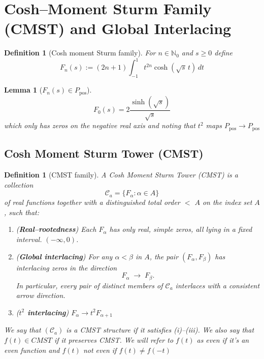 \documentclass[11pt]{article}
\theoremstyle{breakdef}
\newtheorem{lemma}[theorem]{Lemma}
\newtheorem{definition}[theorem]{Definition}
\begin{document}
\section{Cosh--Moment Sturm Family (CMST) and Global Interlacing}
\begin{definition}[Cosh moment Sturm family]\label{def:CMST}
For $n \in \mathbb{N}_0$ and $s\ge0$ define
\begin{equation}
F_n(s):=(2n+1)\int_{-1}^1 t^{2n}\cosh(\sqrt{s}\,t)\,dt
\end{equation}

\end{definition}
\begin{lemma}[$F_n(s) \in P_{\mathrm{pos}}$]
\begin{equation}
F_0(s) = 2\frac{\sinh \left(\sqrt{s}\right)}{\sqrt{s}}
\end{equation}
which only has zeros on the negative real axis and noting that $ t^2$ maps $P_{\mathrm{pos}} \to P_{\mathrm{pos}} $
\end{lemma}

\subsection*{Cosh Moment Sturm Tower (CMST)}

\begin{definition}[CMST family]
A \emph{Cosh Moment Sturm Tower} (CMST) is a collection
\[
\mathcal{C}_a = \{F_\alpha : \alpha\in A\}
\]
of real functions together
with a distinguished total order $<$ $A$ on the index set $A$, such that:

\begin{enumerate}
  \item[(i)] (\textbf{Real--rootedness}) Each $F_\alpha$ has only real,
  simple zeros, all lying in a fixed interval. $(-\infty,0)$.

  \item[(ii)] (\textbf{Global interlacing}) For any $\alpha<\beta$ in $A$,
  the pair $(F_\alpha,F_\beta)$ has interlacing zeros in the direction
  \[
  F_\alpha \;\to\; F_\beta.
  \]
  In particular, every pair of distinct members of $\mathcal{C}_a$
  interlaces with a consistent arrow direction.

  \item[(iii)] (\textbf{$t^2$ interlacing})
  $F_\alpha \to t^2 F_{\alpha+1}$
\end{enumerate}

We say that $(\mathcal{C}_a)$ is a CMST structure if it
satisfies (i)--(iii).
We also say that $f(t) \in CMST$ if it preserves CMST.
We will refer to $f(t)$ as even if it's an even function and $f(t)$ not even if $f(t) \ne f(-t)$
\end{definition}
\end{document}
